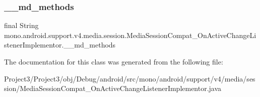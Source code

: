 \subsubsection{\texorpdfstring{\+\_\+\+\_\+md\+\_\+methods}{\_\_md\_methods}}
{\footnotesize\ttfamily final String mono.\+android.\+support.\+v4.\+media.\+session.\+Media\+Session\+Compat\+\_\+\+On\+Active\+Change\+Listener\+Implementor.\+\_\+\+\_\+md\+\_\+methods\hspace{0.3cm}{\ttfamily [static]}}



The documentation for this class was generated from the following file\+:\begin{DoxyCompactItemize}
\item 
Project3/\+Project3/obj/\+Debug/android/src/mono/android/support/v4/media/session/Media\+Session\+Compat\+\_\+\+On\+Active\+Change\+Listener\+Implementor.\+java\end{DoxyCompactItemize}
